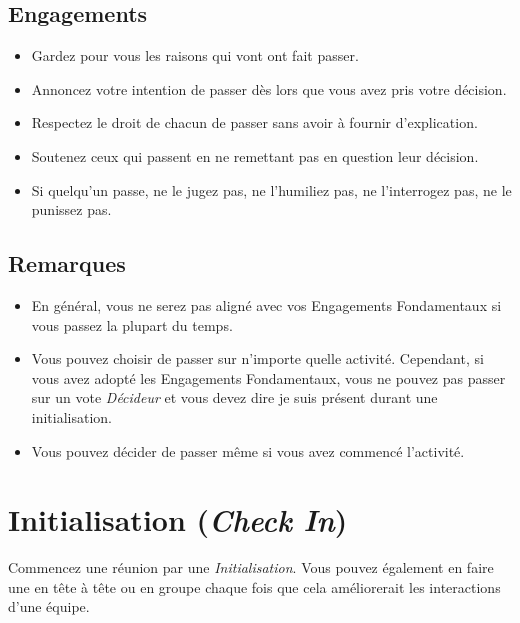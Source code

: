 \documentclass[paper=6in:9in,pagesize=pdftex,headinclude=on,footinclude=on,11pt]{scrbook}
\let\oldsection\section
\renewcommand\section{\clearpage\oldsection}
\begin{document}
\subsection{Engagements}
\begin{itemize}
	\item Gardez pour vous les raisons qui vont ont fait passer.
	\item Annoncez votre intention de passer dès lors que vous avez pris votre décision.
	\item Respectez le droit de chacun de passer sans avoir à fournir d'explication.
	\item Soutenez ceux qui passent en ne remettant pas en question leur décision.
	\item Si quelqu'un passe, ne le jugez pas, ne l'humiliez pas, ne l'interrogez pas, ne le punissez pas.
\end{itemize}

\subsection{Remarques}
\begin{itemize}
	\item En général, vous ne serez pas aligné avec vos Engagements Fondamentaux si vous passez la plupart du temps.
	\item Vous pouvez choisir de passer sur n'importe quelle activité. Cependant, si vous avez adopté les Engagements
	      Fondamentaux, vous ne pouvez pas passer sur un vote \emph{Décideur} et vous devez dire \og{}je suis présent\fg{}
	      durant une initialisation.
	\item Vous pouvez décider de passer même si vous avez commencé l'activité.
\end{itemize}

\section{Initialisation (\emph{Check In})} \label{initialisation}

Commencez une réunion par une \emph{Initialisation}. Vous pouvez également en faire une en tête à tête ou en groupe chaque fois que
cela améliorerait les interactions d'une équipe.
\end{document}
